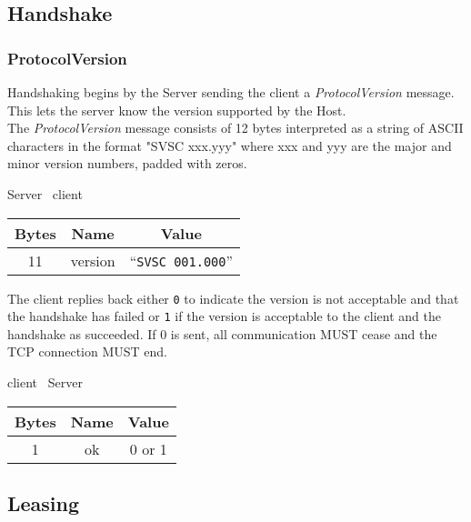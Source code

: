 \documentclass{article}
\begin{document}
    \subsection{Handshake}

    \subsubsection{ProtocolVersion}

    Handshaking begins by the Server sending the client a \emph{ProtocolVersion} message. This lets the server know
    the version supported by the Host.\\

    The \emph{ProtocolVersion} message consists of 12 bytes interpreted as a string of ASCII characters in the format
    "SVSC xxx.yyy" where xxx and yyy are the major and minor version numbers, padded with zeros.

    \begin{center}
        Server \textrightarrow\ client\\
        \begin{tabular}{|c|c|c|}
            \hline
            \textbf{Bytes} & \textbf{Name} & \textbf{Value}            \\
            \hline
            11             & version       & ``\texttt{SVSC 001.000}'' \\
            \hline
        \end{tabular}
    \end{center}

    The client replies back either \texttt{0} to indicate the version is not acceptable and that the handshake has
    failed or \texttt{1} if the version is acceptable to the client and the handshake as succeeded. If 0 is sent, all
    communication MUST cease and the TCP connection MUST end.

    \begin{center}
        client \textrightarrow\ Server\\
        \begin{tabular}{|c|c|c|}
            \hline
            \textbf{Bytes} & \textbf{Name} & \textbf{Value} \\
            \hline
            1              & ok            & 0 or 1         \\
            \hline
        \end{tabular}
    \end{center}

    \subsection{Leasing}
\end{document}
